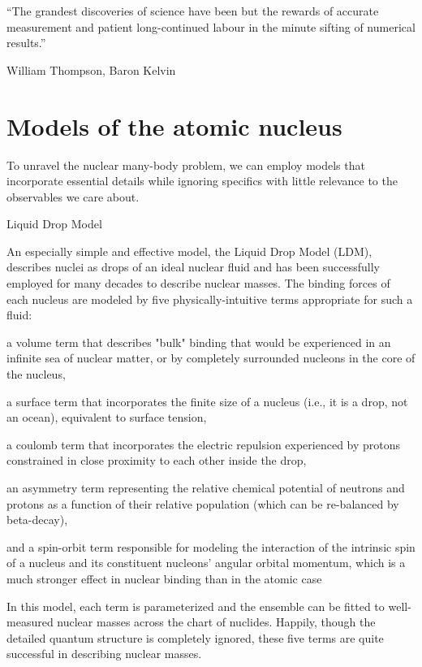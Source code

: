 
\epigraph{``The grandest discoveries of science have been but the rewards of
    accurate measurement and patient long-continued labour in the minute
sifting of numerical results.''}{William Thompson,  Baron Kelvin}

\section{Models of the atomic nucleus}

To unravel the nuclear many-body problem, we can
employ models that incorporate essential details while ignoring specifics with
little relevance to the observables we care about.

Liquid Drop Model

An especially simple and
effective model, the Liquid Drop Model (LDM), describes nuclei as drops of
an ideal nuclear fluid and has been successfully employed for many decades to
describe nuclear masses. The binding forces of each nucleus are modeled by five
physically-intuitive terms appropriate for such a fluid:

a volume term that describes "bulk" binding that would be experienced in an
infinite sea of nuclear matter, or  by completely surrounded nucleons in the core of the nucleus,

a surface term that incorporates the finite size of a nucleus (i.e., it is a
drop, not an ocean), equivalent to surface tension,

a coulomb term that incorporates the electric repulsion experienced by protons
constrained in close proximity to each other inside the drop,

an asymmetry term representing the relative chemical potential of neutrons and
protons as a function of their relative population (which can be re-balanced by
beta-decay),

and a spin-orbit term responsible for modeling the interaction of the intrinsic spin
of a nucleus and its constituent nucleons' angular orbital momentum, which is
a much stronger effect in nuclear binding than in the atomic case

In this model, each term is parameterized and the ensemble can be fitted to
well-measured nuclear masses across the chart of nuclides. Happily, though the detailed
quantum structure is completely ignored, these five terms are quite successful
in describing nuclear masses.

